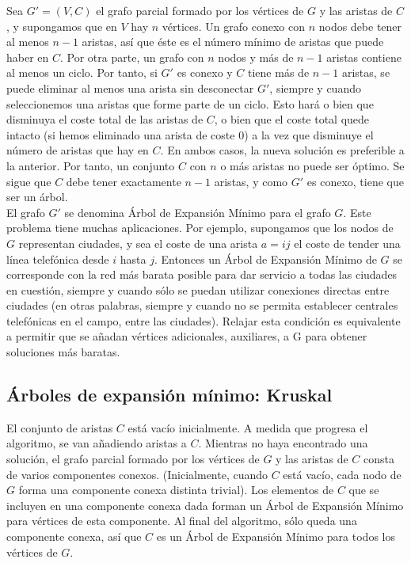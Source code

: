 Sea $G' = (V,C)$ el grafo parcial formado por los vértices de $G$ y las aristas de $C$, y supongamos que en $V$ hay $n$ vértices. Un grafo conexo con $n$ nodos debe tener al menos $n-1$ aristas, así que éste es el número mínimo de aristas que puede haber en $C$. Por otra parte, un grafo con $n$ nodos y más de $n-1$ aristas contiene al menos un ciclo. Por tanto, si $G'$ es conexo y $C$ tiene más de $n-1$ aristas, se puede eliminar al menos una arista sin desconectar $G'$, siempre y cuando seleccionemos una aristas que forme parte de un ciclo. Esto hará o bien que disminuya el coste total de las aristas de $C$, o bien que el coste total quede intacto (si hemos eliminado una arista de coste 0) a la vez que disminuye el número de aristas que hay en $C$. En ambos casos, la nueva solución es preferible a la anterior. Por tanto, un conjunto $C$ con $n$ o más aristas no puede ser óptimo. Se sigue que $C$ debe tener exactamente $n-1$ aristas, y como $G'$ es conexo, tiene que ser un árbol.\\

El grafo $G'$ se denomina Árbol de Expansión Mínimo para el grafo $G$. Este problema tiene muchas aplicaciones. Por ejemplo, supongamos que los nodos de $G$ representan ciudades, y sea el coste de una arista $a = ij$ el coste de tender una línea telefónica desde $i$ hasta $j$. Entonces un Árbol de Expansión Mínimo de $G$ se corresponde con la red más barata posible para dar servicio a todas las ciudades en cuestión, siempre y cuando sólo se puedan utilizar conexiones directas entre ciudades (en otras palabras, siempre y cuando no se permita establecer centrales telefónicas en el campo, entre las ciudades). Relajar esta condición es equivalente a permitir que se añadan vértices adicionales, auxiliares, a G para obtener soluciones más baratas.\\

\subsection{Árboles de expansión mínimo: Kruskal}
\label{sec:kruskal}

El conjunto de aristas $C$ está vacío inicialmente. A medida que progresa el algoritmo, se van añadiendo aristas a $C$. Mientras no haya encontrado una solución, el grafo parcial formado por los vértices de $G$ y las aristas de $C$ consta de varios componentes conexos. (Inicialmente, cuando $C$ está vacío, cada nodo de $G$ forma una componente conexa distinta trivial). Los elementos de $C$ que se incluyen en una componente conexa dada forman un Árbol de Expansión Mínimo para vértices de esta componente. Al final del algoritmo, sólo queda una componente conexa, así que $C$ es un Árbol de Expansión Mínimo para todos los vértices de $G$.\\

